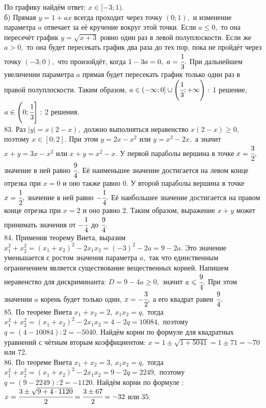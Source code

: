 По графику найдём ответ: $x\in[-3;1).$\\
б) Прямая $y=1+ax$ всегда проходит через точку $(0;1),$ и изменение параметра $a$ отвечает за её кручение вокруг этой точки. Если $a\leqslant0,$ то она пересечёт график $y=\sqrt{x+3}$ ровно один раз в левой полуплоскости. Если же $a>0,$ то она будет пересекать график два раза до тех пор, пока не пройдёт через точку $(-3;0),$ что произойдёт, когда $1-3a=0,\ a=\cfrac{1}{3}.$ При дальнейшем увеличении параметра $a$ прямая будет пересекать график только один раз в правой полуплоскости. Таким образом, $a\in(-\infty;0]\cup\left(\cfrac{1}{3};+\infty\right):$ 1 решение, $a\in\left(0;\cfrac{1}{3}\right]:$ 2 решения.\\
83.  Раз $|y|=x(2-x),$ должно выполняться неравенство $x(2-x)\geqslant0,$ поэтому $x\in[0;2].$ При этом $y=2x-x^2$ или $y=x^2-2x,$ а значит $x+y=3x-x^2$ или $x+y=x^2-x.$ У первой параболы вершина в точке $x=\cfrac{3}{2},$ значение в ней равно $\cfrac{9}{4}.$ Её наименьшее значение достигается на левом конце отрезка при $x=0$ и оно также равно 0. У второй параболы вершина в точке $x=\cfrac{1}{2},$ значение в ней равно $-\cfrac{1}{4}.$ Её наибольшее значение достигается на правом конце отрезка при $x=2$ и оно равно 2. Таким образом, выражение $x+y$ может принимать значения от $-\cfrac{1}{4}$ до $\cfrac{9}{4}.$\\
84. Применив теорему Виета, выразим $x_1^2+x_2^2=(x_1+x_2)^2-2x_1x_2=(-3)^2-2a=9-2a.$ Это значение уменьшается с ростом значения параметра $a,$ так что единственным ограничением является существование вещественных корней. Напишем неравенство для дискриминанта: $D=9-4a\geqslant0,$ значит $a\leqslant \cfrac{9}{4}.$ При этом значении $a$ корень будет только один, $x=-\cfrac{3}{2},$ а его квадрат равен $\cfrac{9}{4}.$\\
85. По теореме Виета $x_1+x_2=2,\ x_1x_2=q,$ тогда $x_1^2+x_2^2=(x_1+x_2)^2-2x_1x_2=4-2q=10084,$ поэтому $q=(4-10084):2=-5040.$ Найдём корни по формуле для квадратных уравнений с чётным вторым коэффициентом: $x=1\pm\sqrt{1+5041}=1\pm71=-70$ или 72.\\
86. По теореме Виета $x_1+x_2=3,\ x_1x_2=q,$ тогда $x_1^2+x_2^2=(x_1+x_2)^2-2x_1x_2=9-2q=2249,$ поэтому $q=(9-2249):2=-1120.$ Найдём корни по формуле : $x=\cfrac{3\pm\sqrt{9+4\cdot1120}}{2}=\cfrac{3\pm67}{2}=-32$ или 35.\\
